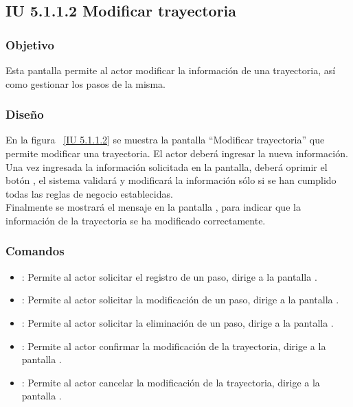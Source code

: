 \subsection{IU 5.1.1.2 Modificar trayectoria}

\subsubsection{Objetivo}
	
	Esta pantalla permite al actor modificar la información de una trayectoria, así como gestionar los pasos de la misma.

\subsubsection{Diseño}

    En la figura ~\ref{IU 5.1.1.2} se muestra la pantalla ``Modificar trayectoria'' que permite modificar una trayectoria. El actor deberá ingresar la nueva información.\\
    
    
    Una vez ingresada la información solicitada en la pantalla, deberá oprimir el botón 
    , el sistema validará y modificará la información sólo si se han cumplido todas las reglas de negocio establecidas.  \\
    
    Finalmente se mostrará el mensaje  en la pantalla ,
    para indicar que la información de la trayectoria
    se ha modificado correctamente.        




\subsubsection{Comandos}
\begin{itemize}
	\item {}: Permite al actor solicitar el registro de un paso, dirige a la pantalla .
	\item \btnEditar[Modificar]: Permite al actor solicitar la modificación de un paso, dirige a la pantalla .
	\item \btnEliminar[Eliminar]: Permite al actor solicitar la eliminación de un paso, dirige a la pantalla .
	\item {}: Permite al actor confirmar la modificación de la trayectoria, dirige a la pantalla .
	\item {}: Permite al actor cancelar la modificación de la trayectoria, dirige a la pantalla .
\end{itemize}

